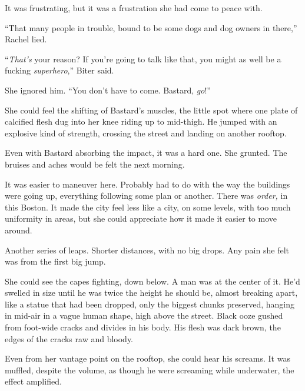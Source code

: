 It was frustrating, but it was a frustration she had come to peace with.



``That many people in trouble, bound to be some dogs and dog owners in there,'' Rachel lied.



``\emph{That's }your reason?  If you're going to talk like that, you might as well be a fucking \emph{superhero},'' Biter said.



She ignored him.  ``You don't have to come.  Bastard, \emph{go}!''



She could feel the shifting of Bastard's muscles, the little spot where one plate of calcified flesh dug into her knee riding up to mid-thigh.  He jumped with an explosive kind of strength, crossing the street and landing on another rooftop.



Even with Bastard absorbing the impact, it was a hard one.  She grunted.  The bruises and aches would be felt the next morning.



It was easier to maneuver here.  Probably had to do with the way the buildings were going up, everything following some plan or another.  There was \emph{order, }in this Boston.  It made the city feel less like a city, on some levels, with too much uniformity in areas, but she could appreciate how it made it easier to move around.



Another series of leaps.  Shorter distances, with no big drops.  Any pain she felt was from the first big jump.



She could see the capes fighting, down below.  A man was at the center of it.  He'd swelled in size until he was twice the height he should be, almost breaking apart, like a statue that had been dropped, only the biggest chunks preserved, hanging in mid-air in a vague human shape, high above the street.  Black ooze gushed from foot-wide cracks and divides in his body.  His flesh was dark brown, the edges of the cracks raw and bloody.



Even from her vantage point on the rooftop, she could hear his screams.  It was muffled, despite the volume, as though he were screaming while underwater, the effect amplified.



